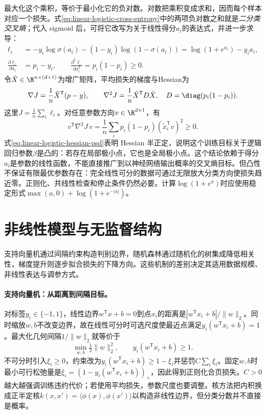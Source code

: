 最大化这个乘积，等价于最小化它的负对数。对数把乘积变成求和，因而每个样本对应一个损失。式\eqref{eq:linear-logistic-cross-entropy}中的两项负对数之和就是\emph{二分类交叉熵}；代入 sigmoid 后，可将它改写为关于线性得分$a_i$的表达式，并进一步求导：
\begin{align}
 \ell_i&=-y_i\log\sigma(a_i)-(1-y_i)\log(1-\sigma(a_i))
 =\log(1+e^{a_i})-y_ia_i,\label{eq:linear-logistic-cross-entropy}\\
 \frac{\partial\ell_i}{\partial a_i}&=p_i-y_i,\qquad
 \frac{\partial^2\ell_i}{\partial a_i^2}=p_i(1-p_i)\geq0.
\end{align}
令$\tilde X\in\R^{n\times(d+1)}$为增广矩阵，平均损失的梯度与Hessian为
\begin{equation}
 \nabla J=\frac1n\tilde X^{\mathsf T}(p-y),\qquad
 \nabla^2J=\frac1n\tilde X^{\mathsf T}D\tilde X,
 \quad D=\diag(p_i(1-p_i)).
\end{equation}
这里$J=\frac1n\sum_i\ell_i$。对任意参数方向$v\in\R^{d+1}$，有
\begin{equation}
 v^{\mathsf T}\nabla^2J\,v
 =\frac1n\sum_i p_i(1-p_i)(\tilde x_i^{\mathsf T}v)^2\geq0.\label{eq:linear-logistic-hessian-psd}
\end{equation}
式\eqref{eq:linear-logistic-hessian-psd}表明 Hessian 半正定，说明这个训练目标关于逻辑回归参数$\beta$是凸的：若存在局部极小点，它也是全局极小点。这个结论依赖于得分$a_i$是参数的线性函数，不能直接推广到以神经网络输出概率的交叉熵目标。但凸性不保证有限最优参数存在：完全线性可分的数据可通过无限放大分类方向使损失趋近零。正则化、共线性检查和停止条件仍然必要。计算$\log(1+e^a)$时应使用稳定形式$\max(a,0)+\log(1+e^{-|a|})$。

\section{非线性模型与无监督结构}
支持向量机通过间隔约束构造判别边界，随机森林通过随机化的树集成降低相关性，梯度提升则逐步拟合损失的下降方向\cite{cortes1995svm,breiman2001forest,friedman2001boosting}。这些机制的差别决定其适用数据规模、非线性表达与调参方式。
\paragraph{支持向量机：从距离到间隔目标。}
对标签$y_i\in\{-1,1\}$，线性边界$w^{\mathsf T}x+b=0$到点$x_i$的距离是$|w^{\mathsf T}x_i+b|/\|w\|_2$。同时缩放$w,b$不改变边界，故在线性可分时可选尺度使最近点满足$y_i(w^{\mathsf T}x_i+b)=1$。最大化几何间隔$1/\|w\|_2$就等价于
\begin{equation}
 \min_{w,b}\tfrac12\|w\|_2^2,\qquad
 y_i(w^{\mathsf T}x_i+b)\geq1.
\end{equation}
不可分时引入$\xi_i\geq0$，约束改为$y_i(w^{\mathsf T}x_i+b)\geq1-\xi_i$并惩罚$C\sum_i\xi_i$。固定$w,b$时最小可行松弛量是$\xi_i=(1-y_i(w^{\mathsf T}x_i+b))_+$，因此得到正则化合页损失。$C>0$越大越强调训练违约代价；若使用平均损失，参数尺度也要调整。核方法把内积换成正半定核$k(x,x')=\langle\phi(x),\phi(x')\rangle$以构造非线性边界，但分类分数并不直接是概率。

